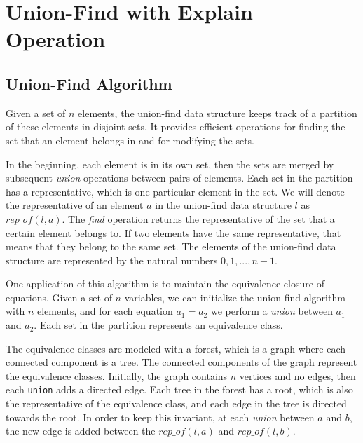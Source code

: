 
\chapter{Union-Find with Explain Operation}\label{chapter:union_find}

\section{Union-Find Algorithm}
\label{section:uf-algorithm}

Given a set of $n$ elements, the union-find data structure keeps track of a partition of these elements in disjoint sets. It provides efficient operations for finding the set that an element belongs in and for modifying the sets.

In the beginning, each element is in its own set, then the sets are merged by subsequent \emph{union} operations between pairs of elements. Each set in the partition has a representative, which is one particular element in the set. We will denote the representative of an element $a$ in the union-find data structure $l$ as $rep\_of(l, a)$. The \emph{find} operation returns the representative of the set that a certain element belongs to. If two elements have the same representative, that means that they belong to the same set. The elements of the union-find data structure are represented by the natural numbers $0,1,...,n-1$.

One application of this algorithm is to maintain the equivalence closure of equations. Given a set of $n$ variables, we can initialize the union-find algorithm with $n$ elements, and for each equation $a_1 = a_2$ we perform a \emph{union} between $a_1$ and $a_2$. Each set in the partition represents an equivalence class.

The equivalence classes are modeled with a forest, which is a graph where each connected component is a tree. The connected components of the graph represent the equivalence classes. Initially, the graph contains $n$ vertices and no edges, then each \lstinline{union} adds a directed edge.  Each tree in the forest has a root, which is also the representative of the equivalence class, and each edge in the tree is directed towards the root. In order to keep this invariant, at each \emph{union} between $a$ and $b$, the new edge is added between the $rep\_of(l,a)$ and $rep\_of(l, b)$.

